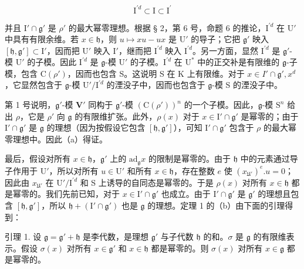 \[
\mathrm{I} ^ {\prime d} \subset \mathrm{I} \subset \mathrm{I} ^ {\prime}
\]

并且 \(\mathrm{I}'\cap \mathfrak{g}'\) 是 \(\rho'\) 的最大幂零理想。根据 § 2，第 6 号，命题 6 的推论，\(\mathrm{I}^{\prime d}\) 在 \(\mathrm{U}'\) 中具有有限余维。若 \(x\in \mathfrak{h}\)，则 \(u\mapsto xu - ux\) 是 \(\mathrm{U}'\) 的导子；它把 \(\mathfrak{g}'\) 映入 \([\mathfrak{h},\mathfrak{g}']\subset \mathrm{I}'\)，因而把 \(\mathrm{U}'\) 映入 \(\mathrm{I}'\)，继而把 \(\mathrm{I}^{\prime d}\) 映入 \(\mathrm{I}^{\prime d}\)。另一方面，显然 \(\mathrm{I}^{\prime d}\) 是 \(\mathfrak{g}'\)-模 \(\mathrm{U}'\) 的子模。因此 \(\mathrm{I}^{\prime d}\) 是 \(\mathfrak{g}\)-模 \(\mathrm{U}'\) 的子模。\(\mathrm{I}^{\prime d}\) 在 \(\mathrm{U}^*\) 中的正交补是有限维的 \(\mathfrak{g}\)-子模，包含 \(\mathrm{C}(\rho')\)，因而也包含 S。这说明 S 在 K 上有限维。对于 \(x\in I'\cap \mathfrak{g}', x^d\)，它显然包含于 \(\mathfrak{g}\)-模 \(\mathrm{U}' / \mathrm{I}^{\prime d}\) 的湮没子中，因而也包含于 \(\mathfrak{g}\)-模 S 的湮没子中。

第 1 号说明，\(\mathfrak{g}'\)-模 \(\mathbf{V}'\) 同构于 \(\mathfrak{g}'\)-模 \((\mathrm{C}(\rho'))^n\) 的一个子模。因此，\(\mathfrak{g}\)-模 \(\mathrm{S}^n\) 给出 \(\rho\)，它是 \(\rho'\) 向 \(\mathfrak{g}\) 的有限维扩张。此外，\(\rho(x)\) 对于 \(x \in \mathrm{I}' \cap \mathfrak{g}'\) 是幂零的；由于 \(\mathrm{I}' \cap \mathfrak{g}'\) 是 \(\mathfrak{g}\) 的理想（因为按假设它包含 \([\mathfrak{h},\mathfrak{g}']\)），可知 \(\mathrm{I}'\cap \mathfrak{g}'\) 包含于 \(\rho\) 的最大幂零理想中。因此（a）得证。

最后，假设对所有 \(x \in \mathfrak{h}\)，\(\mathfrak{g}'\) 上的 \(\mathrm{ad}_{\mathfrak{g}}x\) 的限制是幂零的。由于 \(\mathfrak{h}\) 中的元素通过导子作用于 \(\mathrm{U}'\)，所以对所有 \(u \in \mathrm{U}'\) 和所有 \(x \in \mathfrak{h}\)，存在整数 \(e\) 使 \((x_{\mathfrak{U}'})^e.u = 0\)；因此由 \(x_{\mathfrak{U}'}\) 在 \(\mathrm{U}' / \mathrm{I}^{\prime d}\) 和 S 上诱导的自同态是幂零的。于是 \(\rho(x)\) 对所有 \(x \in \mathfrak{h}\) 都是幂零的。我们先前已知，对于 \(x \in \mathrm{I}' \cap \mathfrak{g}'\) 也成立。由于 \(\mathrm{I}' \cap \mathfrak{g}'\) 是 \(\mathfrak{g}'\) 的理想且包含 \([\mathfrak{h}, \mathfrak{g}']\)，所以 \(\mathfrak{h} + (\mathrm{I}' \cap \mathfrak{g}')\) 也是 \(\mathfrak{g}\) 的理想。定理 1 的（b）由下面的引理得到：

引理 1. 设 \(\mathfrak{g} = \mathfrak{g}' + \mathfrak{h}\) 是李代数，是理想 \(\mathfrak{g}'\) 与子代数 \(\mathfrak{h}\) 的和。\(\sigma\) 是 \(\mathfrak{g}\) 的有限维表示。假设 \(\sigma(x)\) 对所有 \(x \in \mathfrak{g}'\) 和 \(x \in \mathfrak{h}\) 都是幂零的。则 \(\sigma(x)\) 对所有 \(x \in \mathfrak{g}\) 都是幂零的。

